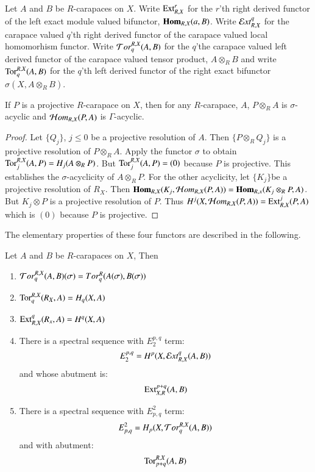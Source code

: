 \begin{definition}\label{chap6-definition-3.2}
Let $A$ and $B$ be $R$-carapaces on $X$. Write $\operatorname{Ext}_{R, X}^{r}$ for the $r$'th right derived functor of the left exact module valued bifunctor, $\operatorname{\mathbf{Hom}}_{R, X}(a, B)$. Write $\mathcal{E} xt_{R, X}^{q}$ for the carapace valued $q$'th right derived functor of the carapace valued local homomorhism functor. Write $\mathcal{T} or_{q}^{R,X}(A, B)$ for the $q$'the carapace valued left derived functor of the carapace valued tensor product, $A\otimes_{R}B$ and write $\operatorname{Tor}_{q}^{R, X}(A, B)$ for the $q$'th left derived functor of the right exact bifunctor $\sigma(X, A\otimes_{R}B)$. 
\end{definition}

\begin{seclem}\label{chap6-lemma-3.3}
If $P$ is a projective $R$-carapace on $X$, then for any $R$-carapace, $A$, $P\otimes_{R} A$ is $\sigma$-acyclic and $\mathcal{H} om_{R, X}(P, A)$ is $\Gamma$-acyclic.
\end{seclem}

\begin{proof}
Let $\{Q_{j}\}$, $j \leq 0$ be  a projective resolution of $A$. Then $\{P \otimes_{R} Q_{j}\}$ is a projective resolution of $P \otimes_{R} A$. Apply the functor $\sigma$ to obtain $\operatorname{Tor}_{j}^{R,X}(A, P) = H_{j}(A\otimes_{R}P)$. But $\operatorname{Tor}_{j}^{R, X}(A, P) = (0)$ because $P$ is projective. This establishes the $\sigma$-acyclicity of $A\otimes_{R}P$. For the other acyclicity, let $\{K_{j}\}$\pageoriginale be a projective resolution of $R_{X}$. Then $\bHom_{R, X}(K_{j},\break \calH om_{R, X}(P, A)) = \bHom_{R, x}(K_{j}\otimes_{R}P, A)$. But $K_{j} \otimes P$ is a projective resolution of $P$. Thus $H^{j}(X, \mathcal{H} om_{R,X}(P, A)) = \operatorname{Ext}_{R, X}^{j}(P, A)$ which is $(0)$ because $P$ is projective.
\end{proof}

The elementary properties of these four functors are described in the following.

\begin{secprop}\label{chap6-lemma-3.4}
Let $A$ and $B$ be $R$-carapaces on $X$, Then
    \begin{enumerate}[(1)]
    \item $\mathcal{T} or_{q}^{R,X}(A, B)(\sigma) = Tor_{q}^{R}(A(\sigma), B(\sigma))$\label{chap6-lemma3.4-enum-1}
    \item $\operatorname{Tor}_{q}^{R, X}(R_{X}, A) = H_{q}(X, A)$\label{chap6-lemma3.4-enum-2}
    \item $\operatorname{Ext}_{R,X}^{q}(R_{x}, A) = H^{q}(X,A)$\label{chap6-lemma3.4-enum-3}
    \item There is a spectral sequence with $E_{2}^{p,q}$ term:\label{chap6-lemma3.4-enum-4}
    $$
    E_{2}^{p,q} = H^{p}(X, \mathcal{E} xt_{R,X}^{q}(A, B))
    $$
    and whose abutment is:
    $$
    \operatorname{Ext}_{X,R}^{p+q}(A, B)
    $$
    \item There is a spectral sequence with $E_{p,q}^{2}$ term:\label{chap6-lemma3.4-enum-5}
    $$
    E_{p,q}^{2} = H_{p}(X, \mathcal{T} or_{q}^{R, X}(A, B))
    $$
    and with abutment:
    $$
    \operatorname{Tor}_{p+q}^{R,X}(A, B)
    $$
    \end{enumerate}
\end{secprop}

